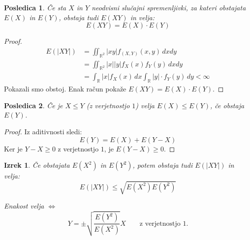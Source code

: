 \documentclass[12pt]{book}
\def\n{\noindent}
\theoremstyle{definition}
\theoremstyle{plain}
\newtheorem{izrek}{Izrek}
\theoremstyle{plain}
\theoremstyle{plain}
\theoremstyle{plain}
\newtheorem{posledica}{Posledica}
\theoremstyle{remark}
\begin{document}
\begin{posledica}
    Če sta $X$ in $Y$ neodvisni slučajni spremenljivki, za kateri obstajata $E(X)$ in $E(Y)$, obstaja tudi $E(XY)$ in velja: 
    $$
    E(X Y)=E(X) \cdot E(Y)
    $$
\end{posledica}

\begin{proof}
    $$
    \begin{aligned}
        E(|X Y|)&=\iint_{\mathbb{R}^2}|x y| f_{(X, Y)}(x, y) \, d x d y \\
        &=\iint_{\mathbb{R}^2}|x| |y| f_X(x) f_Y(y) \,d x d y \\
        &=\int_{\mathbb{R}}|x|  f_X(x) \, d x  \int_{\mathbb{R}}|y| \cdot f_Y(y) \,d y<\infty
    \end{aligned}
    $$
    Pokazali smo obstoj. Enak račun pokaže $E(X Y)=E(X) \cdot E(Y)$.
\end{proof}

\begin{posledica}
    Če je $X \leq Y$ (z verjetnostjo $1$) velja $E(X) \leq E(Y)$, če obstaja $E(Y)$.
\end{posledica}

\begin{proof}
    Iz aditivnosti sledi: 
    $$
    E(Y)=E(X)+E(Y-X)
    $$
    Ker je $Y-X \geq 0$ z verjetnostjo $1$, je $E(Y-X) \geq 0$.
\end{proof}

\begin{izrek}
    Če obstajata $E\left(X^2\right)$ in $E\left(Y^2\right)$, potem obstaja tudi $E(|X Y|)$ in velja: 
    $$
    E(|X Y|) \leq \sqrt{E\left(X^2\right) E\left(Y^2\right)}
    $$
    
    \n Enakost velja $\iff$ 
    $$
    Y=\pm \sqrt{\frac{E\left(Y^2\right)}{E\left(X^2\right)}} X \qquad \text{z verjetnostjo $1$.}
    $$ 
\end{izrek}
\end{document}
